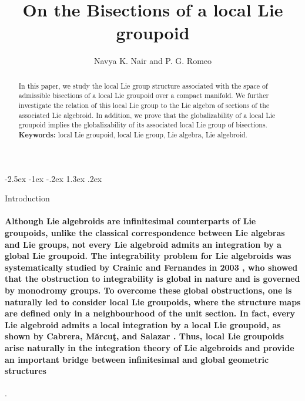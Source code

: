 \documentclass[12pt,a4paper]{amsart}
\makeatletter
\def\section{\@startsection{section}{1}{\z@}%
  {-2.5ex \@plus -1ex \@minus -.2ex}%
  {1.3ex \@plus.2ex}%
  {\normalfont\large\bfseries\raggedright}}
\theoremstyle{plain}
\theoremstyle{definition}
\makeatother
\begin{document}
	\title{On the Bisections of a local Lie groupoid}
	
			\author[
			Navya K Nair and P. G. Romeo]{
			Navya K. Nair and P. G. Romeo}
			
	\address{Department of Mathematics\\
		Cochin University of Science and Technology(CUSAT)\\Kochi, Kerala, India, 682022}
	
\begin{abstract}
In this paper, we study the local Lie group structure associated with the space of admissible bisections of a local Lie groupoid over a compact manifold.
 We further investigate the relation of this local Lie group to the Lie algebra of sections of the associated Lie algebroid.
In addition, we prove that the globalizability of a local Lie groupoid implies the globalizability of its associated local Lie group of bisections.\\





\textbf{Keywords:} local Lie groupoid, local Lie group, Lie algebra, Lie algebroid.
\end{abstract}




\maketitle
\section{Introduction}

\paragraph{ Although    Lie algebroids are infinitesimal counterparts of Lie groupoids, unlike the classical correspondence between Lie algebras and Lie groups, not every Lie algebroid admits an integration by a global Lie groupoid. The integrability problem for Lie algebroids was systematically studied by Crainic and Fernandes in 2003 \cite{Crainic}, who showed that the obstruction to integrability is global in nature and is governed by monodromy groups.  To overcome these global obstructions, one is naturally led to consider local Lie groupoids, where the structure maps are defined only in a neighbourhood of the unit section. In fact, every Lie algebroid admits a local integration by a local Lie groupoid, as shown by Cabrera, M\u{a}rcu\c{t}, and Salazar \cite{Cabrera}. Thus, local Lie groupoids arise naturally in the integration theory of Lie algebroids and provide an important bridge between infinitesimal and global geometric structures}.
\end{document}
